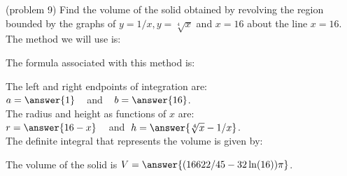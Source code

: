 \documentclass{ximera}
\begin{document}
\begin{problem}(problem 9)
Find the volume of the solid obtained by revolving the region bounded by the graphs of $y = 1/x, y = \sqrt[4] x$ and $x = 16$ about the line $x = 16$.\\
The method we will use is:
\begin{multipleChoice}
\end{multipleChoice}

The formula associated with this method is:
\begin{multipleChoice}
\end{multipleChoice}

The left and right endpoints of integration are:\\
$a = \answer{1}\;\;\;$ and $\;\;\; b = \answer{16}$.\\
The radius and height as functions of $x$ are:\\
$r = \answer{16-x} \;\;\;$ and $\; h = \answer{\sqrt[4]{x} - 1/x}$.\\

The definite integral that represents the volume is given by:\\
\begin{multipleChoice}
\end{multipleChoice}

The volume of the solid is $V = \answer{(16622/45 - 32\ln(16))\pi}$.

\end{problem}
\end{document}
